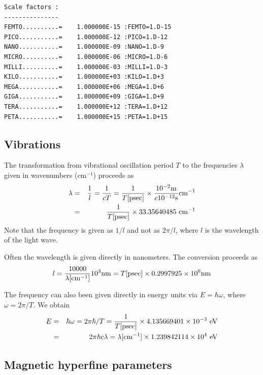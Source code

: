 \documentclass[final,12pt]{article}
\begin{document}
\begin{verbatim}
Scale factors :
---------------
FEMTO..........=    1.000000E-15 :FEMTO=1.D-15
PICO...........=    1.000000E-12 :PICO=1.D-12
NANO...........=    1.000000E-09 :NANO=1.D-9
MICRO..........=    1.000000E-06 :MICRO=1.D-6
MILLI..........=    1.000000E-03 :MILLI=1.D-3
KILO...........=    1.000000E+03 :KILO=1.D+3
MEGA...........=    1.000000E+06 :MEGA=1.D+6
GIGA...........=    1.000000E+09 :GIGA=1.D+9
TERA...........=    1.000000E+12 :TERA=1.D+12
PETA...........=    1.000000E+15 :PETA=1.D+15
\end{verbatim}

\newpage
\subsection{Vibrations}

The transformation from vibrational oscillation period $T$ to the
frequencies $\lambda$ given in wavenumbers (cm$^{-1}$) proceeds as
\begin{eqnarray*}
\lambda&=&\frac{1}{l}=\frac{1}{cT}
=\frac{1}{T[{\rm psec}]}\times 
\frac{10^{-2} {\rm m}}{c 10^{-12}{\rm s}} {\rm cm}^{-1}
\\
&=&\frac{1}{T[{\rm psec}]}  \times 33.35640485\ {\rm cm}^{-1}
\end{eqnarray*}
Note that the frequency is given as $1/l$ and not as $2\pi/l$, where
$l$ is the wavelength of the light wave.

Often the wavelength is given directly in nanometers. The conversion
proceeds as
\begin{displaymath}
l=\frac{10000}{\lambda[{\rm cm}^{-1}]} 10^3 {\rm nm}
=T[{\rm psec}] \times 0.2997925\times 10^6 {\rm nm}
\end{displaymath}

The frequency can also been given directly in energy units via 
$E=\hbar\omega$, where $\omega=2\pi/T$. We obtain
\begin{eqnarray*}
E&=&\hbar\omega=2\pi\hbar/T =\frac{1}{T[{\rm psec}]}
\times 4.135669401 \times 10^{-3}\ {\rm eV}
\\
&=& 2\pi\hbar c \lambda = \lambda[{\rm cm}^{-1}] \times 1.239842114\times
10^4\ {\rm eV}
\end{eqnarray*}

\subsection{Magnetic hyperfine parameters}
\end{document}
